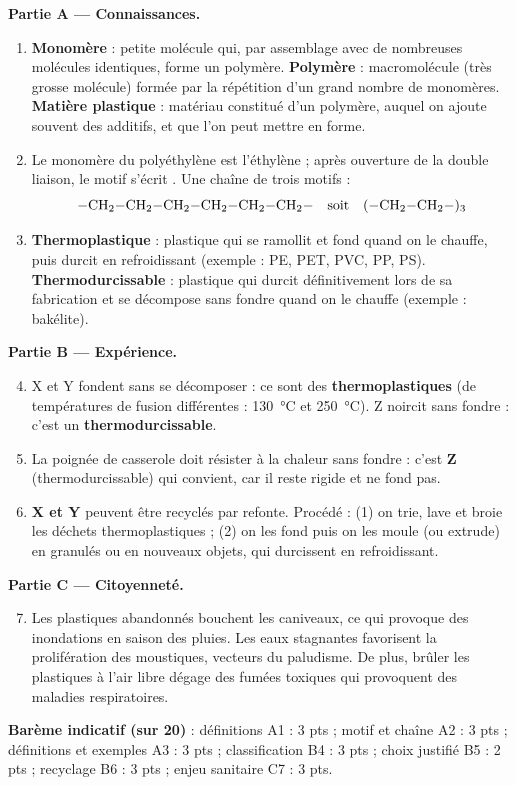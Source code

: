 \documentclass[11pt]{article}
\begin{document}
\begin{corrige}
\textbf{Partie A — Connaissances.}
\begin{enumerate}
\item \textbf{Monomère} : petite molécule qui, par assemblage avec de nombreuses molécules identiques, forme un polymère. \textbf{Polymère} : macromolécule (très grosse molécule) formée par la répétition d'un grand nombre de monomères. \textbf{Matière plastique} : matériau constitué d'un polymère, auquel on ajoute souvent des additifs, et que l'on peut mettre en forme.
\item Le monomère du polyéthylène est l'éthylène  ; après ouverture de la double liaison, le motif s'écrit . Une chaîne de trois motifs :
\[ \ce{-CH2-CH2-CH2-CH2-CH2-CH2-} \quad \text{soit} \quad \ce{(-CH2-CH2-)_{3}} \]
\item \textbf{Thermoplastique} : plastique qui se ramollit et fond quand on le chauffe, puis durcit en refroidissant (exemple : PE, PET, PVC, PP, PS). \textbf{Thermodurcissable} : plastique qui durcit définitivement lors de sa fabrication et se décompose sans fondre quand on le chauffe (exemple : bakélite).
\end{enumerate}
\textbf{Partie B — Expérience.}
\begin{enumerate}
\setcounter{enumi}{3}
\item X et Y fondent sans se décomposer : ce sont des \textbf{thermoplastiques} (de températures de fusion différentes : \SI{130}{\celsius} et \SI{250}{\celsius}). Z noircit sans fondre : c'est un \textbf{thermodurcissable}.
\item La poignée de casserole doit résister à la chaleur sans fondre : c'est \textbf{Z} (thermodurcissable) qui convient, car il reste rigide et ne fond pas.
\item \textbf{X et Y} peuvent être recyclés par refonte. Procédé : (1) on trie, lave et broie les déchets thermoplastiques ; (2) on les fond puis on les moule (ou extrude) en granulés ou en nouveaux objets, qui durcissent en refroidissant.
\end{enumerate}
\textbf{Partie C — Citoyenneté.}
\begin{enumerate}
\setcounter{enumi}{6}
\item Les plastiques abandonnés bouchent les caniveaux, ce qui provoque des inondations en saison des pluies. Les eaux stagnantes favorisent la prolifération des moustiques, vecteurs du paludisme. De plus, brûler les plastiques à l'air libre dégage des fumées toxiques qui provoquent des maladies respiratoires.
\end{enumerate}
\textbf{Barème indicatif (sur 20)} : définitions A1 : 3 pts ; motif et chaîne A2 : 3 pts ; définitions et exemples A3 : 3 pts ; classification B4 : 3 pts ; choix justifié B5 : 2 pts ; recyclage B6 : 3 pts ; enjeu sanitaire C7 : 3 pts.


\end{corrige}
\end{document}
